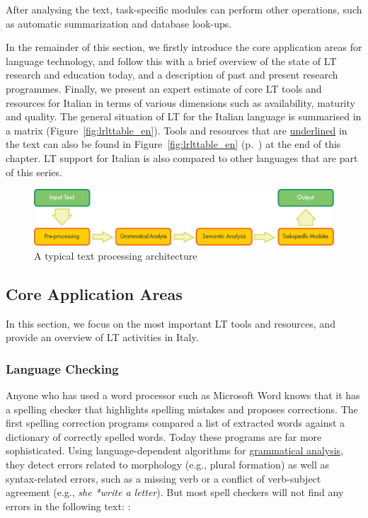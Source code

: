 \documentclass[]{../../metanetpaper}
\begin{document}
\begin{multicols}{2}
After analysing the text, task-specific modules can perform other operations,
such as automatic summarization and database look-ups.

In the remainder of this section, we firstly introduce the core application
areas for language technology, and follow this with a brief overview of the
state of LT research and education today, and a description of past and
present research programmes. Finally, we present an expert estimate of core LT
tools and resources for Italian in terms of various dimensions such as
availability, maturity and quality. The general situation of LT for the Italian
language is summarised in a matrix (Figure~\ref{fig:lrlttable_en}). Tools and
resources that are \underline{underlined} in the text can also be found in
Figure~\ref{fig:lrlttable_en} (p.~\pageref{fig:lrlttable_en}) at the end of
this chapter. LT support for Italian is also compared to other languages that
are part of this series.



\begin{figure}[htb]
  \center
  \includegraphics[width=\textwidth]{../_media/english/text_processing_app_architecture}
  \caption{A typical text processing architecture}
  \label{fig:textprocessingarch_en}
\end{figure}



\subsection{Core Application Areas}

In this section, we focus on the most important LT tools and resources, and
provide an overview of LT activities in Italy. 



\subsubsection{Language Checking}


Anyone who has used a word processor such as Microsoft Word knows that it has a spelling checker that highlights spelling mistakes and proposes corrections. The first spelling correction programs compared a list of extracted words against a dictionary of correctly spelled words. Today these programs are far more sophisticated. Using language-dependent algorithms for \underline{grammatical analysis}, they detect errors related to morphology (e.g., plural formation) as well as syntax-related errors, such as a missing verb or a conflict of verb-subject agreement (e.g., \emph{she *write a letter}). But most spell checkers will not find any errors in the following text: \cite{zar1}:


\end{multicols}
\end{document}

